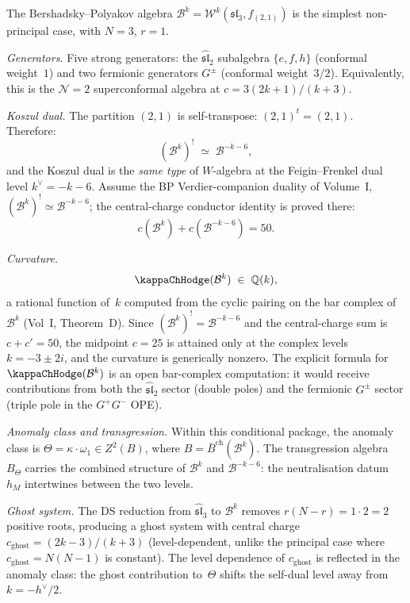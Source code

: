 \begin{computation}
The Bershadsky--Polyakov algebra
$\mathcal B^k=\mathcal W^k(\mathfrak{sl}_3,f_{(2,1)})$
is the simplest non-principal case, with $N=3$, $r=1$.

\emph{Generators.}
Five strong generators: the $\widehat{\mathfrak{sl}}_2$
subalgebra $\{e,f,h\}$ (conformal weight~$1$) and two
fermionic generators $G^\pm$ (conformal weight~$3/2$).
Equivalently, this is the $\mathcal N=2$ superconformal
algebra at $c=3(2k{+}1)/(k{+}3)$.

\emph{Koszul dual.}
The partition $(2,1)$ is self-transpose:
$(2,1)^t=(2,1)$. Therefore:
\[
(\mathcal B^k)^!
\;\simeq\;
\mathcal B^{-k-6},
\]
and the Koszul dual is the \emph{same type} of $W$-algebra
at the Feigin--Frenkel dual level $k^\vee=-k-6$.
Assume the BP Verdier-companion duality of Volume~I,
$(\mathcal B^k)^! \simeq \mathcal B^{-k-6}$; the central-charge
conductor identity is proved there:
\[
c(\mathcal B^k)+c(\mathcal B^{-k-6})=50.
\]

\emph{Curvature.}
\[
\kappaChHodge(\mathcal B^k)
\;\in\;\mathbb Q(k),
\]
a rational function of~$k$ computed from the cyclic pairing
on the bar complex of $\mathcal B^k$ (Vol~I, Theorem~D).
Since $(\mathcal B^k)^!=\mathcal B^{-k-6}$ and the central-charge
sum is $c+c'=50$, the midpoint $c=25$ is attained only at the
complex levels $k=-3\pm 2i$, and the curvature is generically
nonzero.
The explicit formula for $\kappaChHodge(\mathcal B^k)$ is an open
bar-complex computation:
it would receive contributions from both the
$\widehat{\mathfrak{sl}}_2$ sector (double poles) and the
fermionic $G^\pm$ sector (triple pole in the $G^+G^-$ OPE).

\emph{Anomaly class and transgression.}
Within this conditional package, the anomaly class is
$\Theta=\kappa\cdot\omega_1\in Z^2(B)$,
where $B=\bar B^{\mathrm{ch}}(\mathcal B^k)$. The
transgression algebra $B_\Theta$ carries the combined
structure of $\mathcal B^k$ and $\mathcal B^{-k-6}$:
the neutralisation datum $h_M$ intertwines between the two
levels.

\emph{Ghost system.}
The DS reduction from $\widehat{\mathfrak{sl}}_3$ to
$\mathcal B^k$ removes $r(N{-}r)=1\cdot 2=2$ positive roots,
producing a ghost system with central charge
$c_{\mathrm{ghost}}=(2k{-}3)/(k{+}3)$
(level-dependent, unlike the principal case where
$c_{\mathrm{ghost}}=N(N{-}1)$ is constant). The level
dependence of $c_{\mathrm{ghost}}$ is reflected in the
anomaly class: the ghost contribution to~$\Theta$ shifts
the self-dual level away from $k=-h^\vee/2$.


\end{computation}

